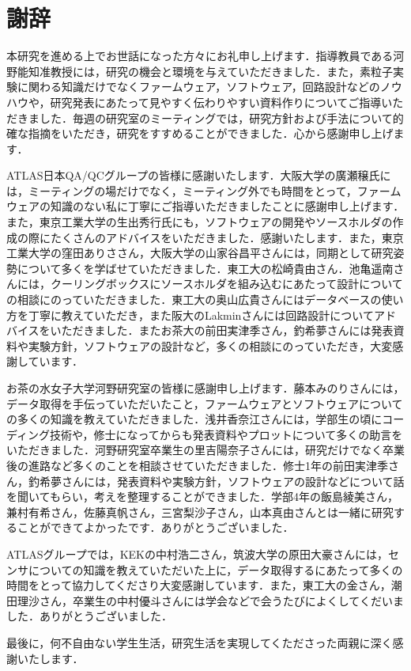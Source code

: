 \chapter*{謝辞}

本研究を進める上でお世話になった方々にお礼申し上げます．指導教員である河野能知准教授には，研究の機会と環境を与えていただきました．また，素粒子実験に関わる知識だけでなくファームウェア，ソフトウェア，回路設計などのノウハウや，研究発表にあたって見やすく伝わりやすい資料作りについてご指導いただきました．毎週の研究室のミーティングでは，研究方針および手法について的確な指摘をいただき，研究をすすめることができました．心から感謝申し上げます．\par
ATLAS日本QA/QCグループの皆様に感謝いたします．大阪大学の廣瀬穣氏には，ミーティングの場だけでなく，ミーティング外でも時間をとって，ファームウェアの知識のない私に丁寧にご指導いただきましたことに感謝申し上げます．また，東京工業大学の生出秀行氏にも，ソフトウェアの開発やソースホルダの作成の際にたくさんのアドバイスをいただきました．感謝いたします．また，東京工業大学の窪田ありささん，大阪大学の山家谷昌平さんには，同期として研究姿勢について多くを学ばせていただきました．東工大の松崎貴由さん．池亀遥南さんには，クーリングボックスにソースホルダを組み込むにあたって設計についての相談にのっていただきました．東工大の奥山広貴さんにはデータベースの使い方を丁寧に教えていただき，また阪大のLakminさんには回路設計についてアドバイスをいただきました．またお茶大の前田実津季さん，釣希夢さんには発表資料や実験方針，ソフトウェアの設計など，多くの相談にのっていただき，大変感謝しています．\par
お茶の水女子大学河野研究室の皆様に感謝申し上げます．藤本みのりさんには，データ取得を手伝っていただいたこと，ファームウェアとソフトウェアについての多くの知識を教えていただきました．浅井香奈江さんには，学部生の頃にコーディング技術や，修士になってからも発表資料やプロットについて多くの助言をいただきました．河野研究室卒業生の里吉陽奈子さんには，研究だけでなく卒業後の進路など多くのことを相談させていただきました．修士1年の前田実津季さん，釣希夢さんには，発表資料や実験方針，ソフトウェアの設計などについて話を聞いてもらい，考えを整理することができました．学部4年の飯島綾美さん，兼村有希さん，佐藤真帆さん，三宮梨沙子さん，山本真由さんとは一緒に研究することができてよかったです．ありがとうございました．\par
ATLASグループでは，KEKの中村浩二さん，筑波大学の原田大豪さんには，センサについての知識を教えていただいた上に，データ取得するにあたって多くの時間をとって協力してくださり大変感謝しています．また，東工大の金さん，潮田理沙さん，卒業生の中村優斗さんには学会などで会うたびによくしてくだいました．ありがとうございました．\par
最後に，何不自由ない学生生活，研究生活を実現してくたださった両親に深く感謝いたします．


